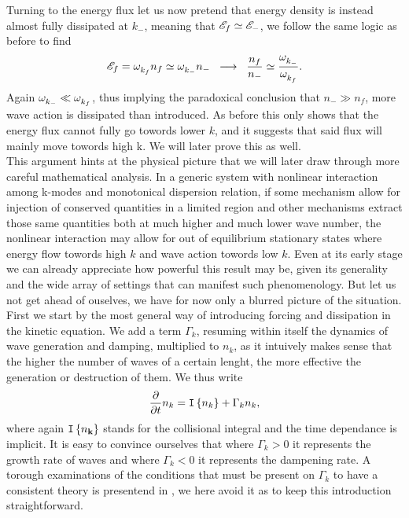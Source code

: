 Turning to the energy flux let us now pretend that energy density is instead almost fully dissipated at $k_-$, meaning that $\mathscr{E}_f \simeq \mathscr{E}_-$, we follow the same 
logic as before to find
\begin{equation}
    \mathscr{E}_f = \omega^{}_{k_f}n_f \simeq \omega^{}_{k_-}n_- \hspace{2mm} \longrightarrow \hspace{2mm} \frac{n_f}{n_-} \simeq \frac{\omega^{}_{k_-}}{\omega^{}_{k_f}}.
\end{equation}   
Again $\omega^{}_{k_-} \ll \omega^{}_{k_f}$, thus implying the paradoxical conclusion that $n_- \gg n_f$, more wave action is dissipated than introduced. As before this only 
shows that the energy flux cannot fully go towords lower $k$, and it suggests that said flux will mainly move towords high k. We will later prove this as well. \\
This argument hints at the physical picture that we will later draw through more careful mathematical analysis. In a generic system with nonlinear interaction among 
k-modes and monotonical dispersion relation, if some mechanism allow for injection of conserved quantities in a limited region and other mechanisms extract those
same quantities both at much higher and much lower wave number, the nonlinear interaction may allow for out of equilibrium stationary states where energy flow towords high
$k$ and wave action towords low $k$. Even at its early stage we can already appreciate how powerful this result may be, given its generality and the wide array of settings
that can manifest such phenomenology. But let us not get ahead of ouselves, we have for now only a blurred picture of the situation. \\

First we start by the most general way of introducing forcing and dissipation in the kinetic equation. We add a term $\Gamma_k$, resuming within itself the dynamics of 
wave generation and damping, multiplied to $n_k$, as it intuively makes sense that the higher the number of waves of a certain lenght, the more effective the generation
or destruction of them. We thus write
\begin{equation}
    \frac{\partial}{\partial t} n_k = \mathtt{I}\left\{n_k\right\}+ \Gamma_k n_k, 
    \label{kineticgamma}
\end{equation} 
where again $\mathtt{I}\left\{n_\mathbf{k}\right\}$ stands for the collisional integral and the time dependance is implicit. It is easy to convince ourselves that where $\Gamma_k > 0$ it represents the growth rate of waves and 
where $\Gamma_k < 0$ it represents the dampening rate. A torough examinations of the conditions that must be present on $\Gamma_k$ to have a consistent theory
is presentend in \cite{Zakharov}, we here avoid it as to keep this introduction straightforward.\\

